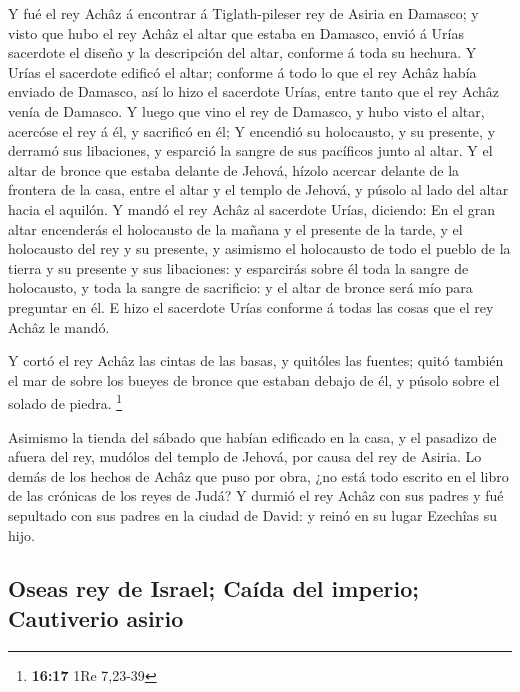  Y fué el rey Achâz á encontrar á Tiglath-pileser rey de
Asiria en Damasco; y visto que hubo el rey Achâz el altar que estaba en
Damasco, envió á Urías sacerdote el diseño y la descripción del altar,
conforme á toda su hechura.  Y Urías el sacerdote edificó
el altar; conforme á todo lo que el rey Achâz había enviado de Damasco,
así lo hizo el sacerdote Urías, entre tanto que el rey Achâz venía de
Damasco.  Y luego que vino el rey de Damasco, y hubo visto
el altar, acercóse el rey á él, y sacrificó en él;  Y
encendió su holocausto, y su presente, y derramó sus libaciones, y
esparció la sangre de sus pacíficos junto al altar.  Y el
altar de bronce que estaba delante de Jehová, hízolo acercar delante de
la frontera de la casa, entre el altar y el templo de Jehová, y púsolo
al lado del altar hacia el aquilón.  Y mandó el rey Achâz
al sacerdote Urías, diciendo: En el gran altar encenderás el holocausto
de la mañana y el presente de la tarde, y el holocausto del rey y su
presente, y asimismo el holocausto de todo el pueblo de la tierra y su
presente y sus libaciones: y esparcirás sobre él toda la sangre de
holocausto, y toda la sangre de sacrificio: y el altar de bronce será
mío para preguntar en él.  E hizo el sacerdote Urías
conforme á todas las cosas que el rey Achâz le mandó.

 Y cortó el rey Achâz las cintas de las basas, y quitóles
las fuentes; quitó también el mar de sobre los bueyes de bronce que
estaban debajo de él, y púsolo sobre el solado de piedra. \footnote{\textbf{16:17}
  1Re 7,23-39}

 Asimismo la tienda del sábado que habían edificado en la
casa, y el pasadizo de afuera del rey, mudólos del templo de Jehová, por
causa del rey de Asiria.  Lo demás de los hechos de Achâz
que puso por obra, ¿no está todo escrito en el libro de las crónicas de
los reyes de Judá?  Y durmió el rey Achâz con sus padres y
fué sepultado con sus padres en la ciudad de David: y reinó en su lugar
Ezechîas su hijo.

\hypertarget{oseas-rey-de-israel-cauxedda-del-imperio-cautiverio-asirio}{%
\subsection{Oseas rey de Israel; Caída del imperio; Cautiverio
asirio}\label{oseas-rey-de-israel-cauxedda-del-imperio-cautiverio-asirio}}

